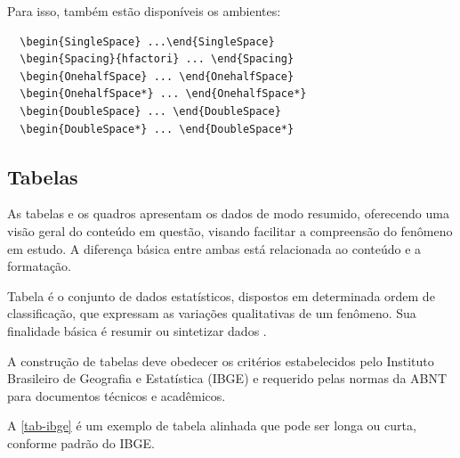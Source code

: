 Para isso, também estão disponíveis os ambientes:
\begin{verbatim}
  \begin{SingleSpace} ...\end{SingleSpace}
  \begin{Spacing}{hfactori} ... \end{Spacing}
  \begin{OnehalfSpace} ... \end{OnehalfSpace}
  \begin{OnehalfSpace*} ... \end{OnehalfSpace*}
  \begin{DoubleSpace} ... \end{DoubleSpace}
  \begin{DoubleSpace*} ... \end{DoubleSpace*} 
\end{verbatim}

\subsection{Tabelas}

As tabelas e os quadros apresentam os dados de modo resumido, oferecendo uma visão geral do conteúdo em questão, visando facilitar a compreensão do fenômeno em estudo. A diferença básica entre ambas está relacionada ao conteúdo e a formatação. 

Tabela é o conjunto de dados estatísticos, dispostos em determinada ordem de classificação, que expressam as variações qualitativas de um fenômeno. Sua finalidade básica é resumir ou sintetizar dados \cite{sibi2009}.

A construção de tabelas deve obedecer os critérios estabelecidos pelo Instituto Brasileiro de Geografia e Estatística (IBGE) e requerido pelas normas da ABNT para documentos técnicos e acadêmicos.

A \autoref{tab-ibge} é um exemplo de tabela alinhada que pode ser longa ou curta, conforme padrão do IBGE.

\begin{table}[htb]
\end{table}


